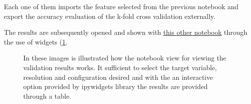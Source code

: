 Each one of them imports the feature selected from the previous notebook and export the accuracy evaluation of the k-fold cross validation externally. \par
The results are subsequently opened and shown with \href{https://github.com/opengeolab/D-DUST/blob/thesis_MB/notebooks/model.ipynb}{this other notebook} through the use of widgets (\ref{fig:view}.
\begin{figure}[H] 
    \centering
    \hfill%
    \caption{In these images is illustrated how the notebook view for viewing the validation results works. It sufficient to select the target variable, resolution and configuration desired and with the an interactive option provided by ipywidgets library the results are provided through a table.}
    \label{fig:view}
\end{figure}

